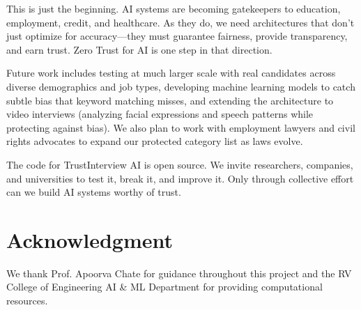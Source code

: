 \documentclass[conference]{IEEEtran}
\begin{document}
This is just the beginning. AI systems are becoming gatekeepers to education, employment, credit, and healthcare. As they do, we need architectures that don't just optimize for accuracy—they must guarantee fairness, provide transparency, and earn trust. Zero Trust for AI is one step in that direction.

Future work includes testing at much larger scale with real candidates across diverse demographics and job types, developing machine learning models to catch subtle bias that keyword matching misses, and extending the architecture to video interviews (analyzing facial expressions and speech patterns while protecting against bias). We also plan to work with employment lawyers and civil rights advocates to expand our protected category list as laws evolve.

The code for TrustInterview AI is open source. We invite researchers, companies, and universities to test it, break it, and improve it. Only through collective effort can we build AI systems worthy of trust.

\section*{Acknowledgment}

We thank Prof. Apoorva Chate for guidance throughout this project and the RV College of Engineering AI \& ML Department for providing computational resources.
\end{document}
